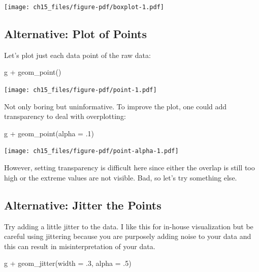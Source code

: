 \documentclass[
  letterpaper,
]{scrbook}
\newenvironment{Shaded}{\begin{snugshade}}{\end{snugshade}}
\newcommand{\AttributeTok}[1]{\textcolor[rgb]{0.40,0.45,0.13}{#1}}
\newcommand{\DecValTok}[1]{\textcolor[rgb]{0.68,0.00,0.00}{#1}}
\newcommand{\FunctionTok}[1]{\textcolor[rgb]{0.28,0.35,0.67}{#1}}
\newcommand{\NormalTok}[1]{\textcolor[rgb]{0.00,0.23,0.31}{#1}}
\newcommand{\SpecialCharTok}[1]{\textcolor[rgb]{0.37,0.37,0.37}{#1}}
\begin{document}
\texttt{[image: ch15\_files/figure-pdf/boxplot-1.pdf]}

\subsection{Alternative: Plot of
Points}\label{alternative-plot-of-points}

Let's plot just each data point of the raw data:

\begin{Shaded}
\begin{Highlighting}[]
\NormalTok{g }\SpecialCharTok{+} \FunctionTok{geom\_point}\NormalTok{()}
\end{Highlighting}
\end{Shaded}

\texttt{[image: ch15\_files/figure-pdf/point-1.pdf]}

Not only boring but uninformative. To improve the plot, one could add
transparency to deal with overplotting:

\begin{Shaded}
\begin{Highlighting}[]
\NormalTok{g }\SpecialCharTok{+} \FunctionTok{geom\_point}\NormalTok{(}\AttributeTok{alpha =}\NormalTok{ .}\DecValTok{1}\NormalTok{)}
\end{Highlighting}
\end{Shaded}

\texttt{[image: ch15\_files/figure-pdf/point-alpha-1.pdf]}

However, setting transparency is difficult here since either the overlap
is still too high or the extreme values are not visible. Bad, so let's
try something else.

\subsection{Alternative: Jitter the
Points}\label{alternative-jitter-the-points}

Try adding a little jitter to the data. I like this for in-house
visualization but be careful using jittering because you are purposely
adding noise to your data and this can result in misinterpretation of
your data.

\begin{Shaded}
\begin{Highlighting}[]
\NormalTok{g }\SpecialCharTok{+} \FunctionTok{geom\_jitter}\NormalTok{(}\AttributeTok{width =}\NormalTok{ .}\DecValTok{3}\NormalTok{, }\AttributeTok{alpha =}\NormalTok{ .}\DecValTok{5}\NormalTok{)}
\end{Highlighting}
\end{Shaded}
\end{document}
